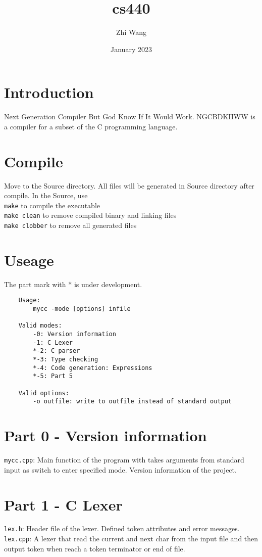 \documentclass{article}
\title{cs440}
\author{Zhi Wang}
\date{January 2023}
\begin{document}
\maketitle

\section{Introduction}
Next Generation Compiler But God Know If It Would Work.
NGCBDKIIWW is a compiler for a subset of the C programming language.

\section{Compile}
Move to the Source directory.
All files will be generated in Source directory after compile.
In the Source, use\\
{\tt make} to compile the executable\\
{\tt make clean} to remove compiled binary and linking files\\
{\tt make clobber} to remove all generated files

\section{Useage}
The part mark with * is under development.

\begin{verbatim}
	Usage:
		mycc -mode [options] infile

	Valid modes:
		-0: Version information
		-1: C Lexer
		*-2: C parser
		*-3: Type checking
		*-4: Code generation: Expressions
		*-5: Part 5

	Valid options:
		-o outfile: write to outfile instead of standard output
\end{verbatim}


\section{Part 0 - Version information}
{\tt mycc.cpp}:
Main function of the program with takes arguments from standard input 
as switch to enter specified mode.
Version information of the project.

\section{Part 1 - C Lexer}
{\tt lex.h}:
Header file of the lexer. 
Defined token attributes and error messages.
{\smallskip}
{\tt lex.cpp}: 
A lexer that read the current and 
next char from the input file and then output token
when reach a token terminator or end of file.
\end{document}
